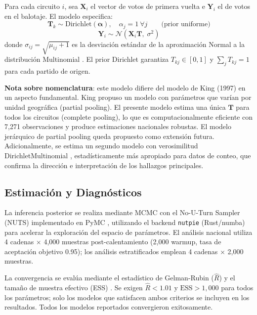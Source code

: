 Para cada circuito $i$, sea $\mathbf{X}_i$ el vector de votos de primera vuelta e $\mathbf{Y}_i$ el de votos en el balotaje. El modelo especifica:
\begin{equation}
  \mathbf{T}_k \sim \text{Dirichlet}(\boldsymbol{\alpha}), \quad \alpha_j = 1\ \forall j \qquad \text{(prior uniforme)}
  \label{eq:prior}
\end{equation}
\begin{equation}
  \mathbf{Y}_i \sim \mathcal{N}\!\left(\mathbf{X}_i \mathbf{T},\; \sigma^2\right)
  \label{eq:likelihood}
\end{equation}
donde $\sigma_{ij} = \sqrt{\mu_{ij} + 1}$ es la desviación estándar de la aproximación Normal a la distribución Multinomial \citep{martin2021bayesian}. El prior Dirichlet garantiza $T_{kj} \in [0,1]$ y $\sum_j T_{kj} = 1$ para cada partido de origen.

\textbf{Nota sobre nomenclatura}: este modelo difiere del modelo de King (1997) en un aspecto fundamental. King propuso un modelo con parámetros que varían por unidad geográfica (partial pooling). El presente modelo estima una única $\mathbf{T}$ para todos los circuitos (complete pooling), lo que es computacionalmente eficiente con 7{,}271 observaciones y produce estimaciones nacionales robustas. El modelo jerárquico de partial pooling queda propuesto como extensión futura. Adicionalmente, se estima un segundo modelo con verosimilitud DirichletMultinomial \citep{mosimann1962compound}, estadísticamente más apropiado para datos de conteo, que confirma la dirección e interpretación de los hallazgos principales.

\subsection{Estimación y Diagnósticos}

La inferencia posterior se realiza mediante MCMC con el No-U-Turn Sampler (NUTS) \citep{betancourt2017conceptual} implementado en PyMC \citep{abril2023pymc}, utilizando el backend \texttt{nutpie} (Rust/numba) para acelerar la exploración del espacio de parámetros. El análisis nacional utiliza 4 cadenas $\times$ 4{,}000 muestras post-calentamiento (2{,}000 warmup, tasa de aceptación objetivo 0.95); los análisis estratificados emplean 4 cadenas $\times$ 2{,}000 muestras.

La convergencia se evalúa mediante el estadístico de Gelman-Rubin ($\hat{R}$) y el tamaño de muestra efectivo (ESS) \citep{vehtari2021rhat, gelman1992inference}. Se exigen $\hat{R} < 1.01$ y $\text{ESS} > 1{,}000$ para todos los parámetros; solo los modelos que satisfacen ambos criterios se incluyen en los resultados. Todos los modelos reportados convergieron exitosamente.


